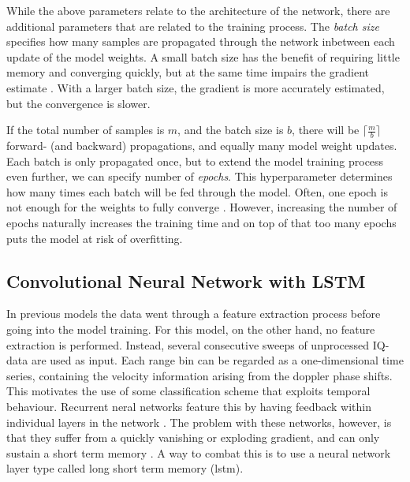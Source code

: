 While the above parameters relate to the architecture of the network, there are additional parameters that are related to the training process. The \emph{batch size} specifies how many samples are propagated through the network inbetween each update of the model weights. A small batch size has the benefit of requiring little memory and converging quickly, but at the same time impairs the gradient estimate \citep{brownlee_2017}. With a larger batch size, the gradient is more accurately estimated, but the convergence is slower. 

If the total number of samples is $m$, and the batch size is $b$, there will be $\lceil \frac mb\rceil$ forward- (and backward) propagations, and equally many model weight updates. Each batch is only propagated once, but to extend the model training process even further, we can specify number of \emph{epochs}. This hyperparameter determines how many times each batch will be fed through the model. Often, one epoch is not enough for the weights to fully converge \citep{kriesel_2007}. However, increasing the number of epochs naturally increases the training time and on top of that too many epochs puts the model at risk of overfitting.


\subsection{Convolutional Neural Network with LSTM}
In previous models the data went through a feature extraction process before going into the model training. For this model, on the other hand, no feature extraction is performed. Instead, several consecutive sweeps of unprocessed IQ-data are used as input. Each range bin can be regarded as a one-dimensional time series, containing the velocity information arising from the doppler phase shifts. This motivates the use of some classification scheme that exploits temporal behaviour. Recurrent neral networks feature this by having feedback within individual layers in the network \citep{karim_majumdar_darabi_chen_2018}. The problem with these networks, however, is that they suffer from a quickly vanishing or exploding gradient, and can only sustain a short term memory \citep{pascanu_mikolov_bengio_2013}. A way to combat this is to use a neural network layer type called long short term memory (\gls{lstm}).

